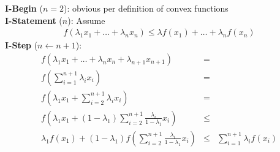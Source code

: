 \documentclass{article}
\begin{document}
\textbf{I-Begin} ($n=2$): obvious per definition of convex functions\\
\textbf{I-Statement} ($n$): Assume
\begin{eqnarray}
f(\lambda_1 x_1+\dots + \lambda_n x_n) \leq \lambda f(x_1) + \dots +\lambda_n f(x_n)
\end{eqnarray}
\textbf{I-Step} ($n \leftarrow n+1$):
\begin{eqnarray}
f(\lambda_1 x_1 + \dots +\lambda_n x_n + \lambda_{n+1} x_{n+1}) &=& \\
f(\sum_{i=1}^{n+1} \lambda_i x_i) &=& \\
f(\lambda_1 x_1 + \sum_{i=2}^{n+1} \lambda_ix_i) &=& \\
f(\lambda_1 x_1 + (1-\lambda_1)\sum_{i=2}^{n+1} \frac{\lambda_i}{1-\lambda_1}x_i) &\leq & \\
\lambda_1 f(x_1) + (1-\lambda_1)f(\sum_{i=2}^{n+1} \frac{\lambda_i}{1-\lambda_1}x_i) &\leq & 
\sum_{i=1}^{n+1}\lambda_i f(x_i)
\end{eqnarray}
\end{document}
